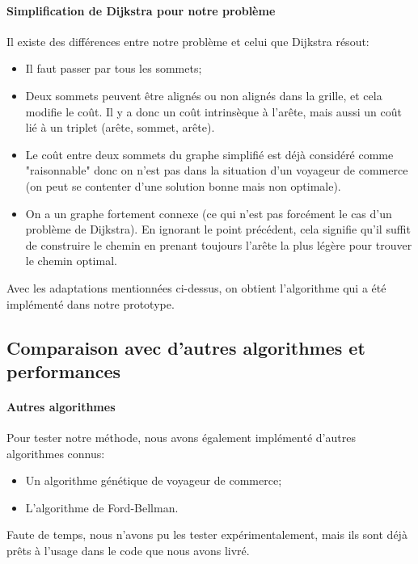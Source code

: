 \paragraph{Simplification de Dijkstra pour notre problème}
Il existe des différences entre notre problème et celui que Dijkstra résout:
\begin{itemize}
	\item Il faut passer par tous les sommets;
	\item Deux sommets peuvent être alignés ou non alignés dans la grille, et cela modifie le coût. Il y a donc un coût intrinsèque à l'arête, mais aussi un coût lié à un triplet (arête, sommet, arête).
	\item Le coût entre deux sommets du graphe simplifié est déjà considéré comme "raisonnable" donc on n'est pas dans la situation d'un voyageur de commerce (on peut se contenter d'une solution bonne mais non optimale).
	\item On a un graphe fortement connexe (ce qui n'est pas forcément le cas d'un problème de Dijkstra). En ignorant le point précédent, cela signifie qu'il suffit de construire le chemin en prenant toujours l'arête la plus légère pour trouver le chemin optimal.
\end{itemize}
Avec les adaptations mentionnées ci-dessus, on obtient l'algorithme qui a été implémenté dans notre prototype.
\subsection{Comparaison avec d'autres algorithmes et performances}
\paragraph{Autres algorithmes}
Pour tester notre méthode, nous avons également implémenté d'autres algorithmes connus:
\begin{itemize}
	\item Un algorithme génétique de voyageur de commerce;
	\item L'algorithme de Ford-Bellman.
\end{itemize}
Faute de temps, nous n'avons pu les tester expérimentalement, mais ils sont déjà prêts à l'usage dans le code que nous avons livré.
